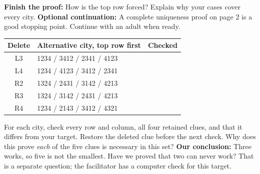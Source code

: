 \documentclass[12pt]{article}
\begin{document}
\textbf{Finish the proof:} How is the top row forced? Explain why your cases cover every city.
\StudentFooter
\newpage
{}\NameLine
\textbf{Optional continuation:} A complete uniqueness proof on page 2 is a good stopping point. Continue with an adult when ready.
\begin{center}\renewcommand{\arraystretch}{1.5}\begin{tabular}{c|l|c}Delete&Alternative city, top row first&Checked\\\hline L3&1234 / 3412 / 2341 / 4123&\\L4&1234 / 4123 / 3412 / 2341&\\R2&1324 / 2431 / 3142 / 4213&\\R3&1324 / 3142 / 2431 / 4213&\\R4&1234 / 2143 / 3412 / 4321&\end{tabular}\end{center}
For each city, check every row and column, all four retained clues, and that it differs from your target. Restore the deleted clue before the next check. Why does this prove \emph{each} of the five clues is necessary in this set?
\textbf{Our conclusion:} Three works, so five is not the smallest. Have we proved that two can never work? That is a separate question; the facilitator has a computer check for this target.\StudentFooter
\end{document}
